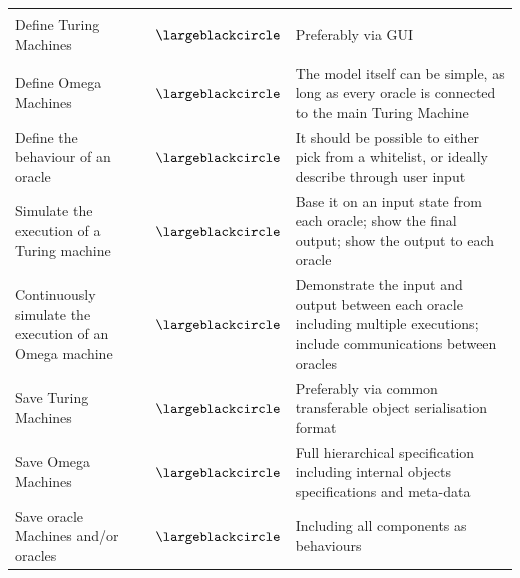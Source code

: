 \documentclass[12pt]{article}
\begin{document}
			\begin{table}[h!]
				\centering
				\begin{tabular}{m{3in} m{0.5in} m{2.5in}}
					Define Turing Machines & \begin{center}\textcolor{BrickRed}{$\largeblackcircle$}\end{center} & Preferably via GUI\\
					Define Omega Machines & \begin{center}\textcolor{BrickRed}{$\largeblackcircle$}\end{center} & The model itself can be simple, as long as every oracle is connected to the main Turing Machine \\
					Define the behaviour of an oracle & \begin{center}\textcolor{BrickRed}{$\largeblackcircle$}\end{center} & It should be possible to either pick from a whitelist, or ideally describe through user input \\
					Simulate the execution of a Turing machine& \begin{center}\textcolor{BrickRed}{$\largeblackcircle$}\end{center} & Base it on an input state from each oracle; show the final output; show the output to each oracle\\
					Continuously simulate the execution of an Omega machine & \begin{center}\textcolor{BrickRed}{$\largeblackcircle$}\end{center} & Demonstrate the input and output between each oracle including multiple executions; include communications between oracles\\
					Save Turing Machines & \begin{center}\textcolor{Dandelion}{$\largeblackcircle$}\end{center} & Preferably via common transferable object serialisation format \\
					Save Omega Machines & \begin{center}\textcolor{Dandelion}{$\largeblackcircle$}\end{center} & Full hierarchical specification including internal objects specifications and meta-data \\
					Save oracle Machines and/or oracles & \begin{center}\textcolor{Dandelion}{$\largeblackcircle$}\end{center} & Including all components as behaviours \\

\end{tabular}
\end{table}
\end{document}
